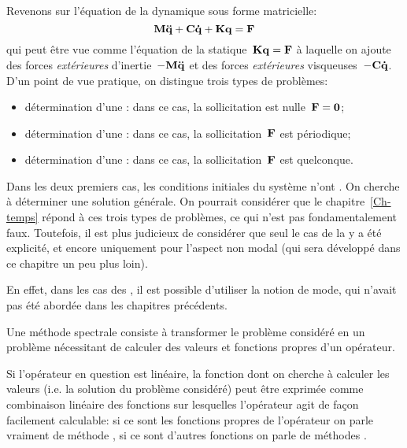 Revenons sur l'équation de la dynamique sous forme matricielle:
\begin{equation} \MM{M}\VV{\ddot{q}}+\MM{C}\VV{\dot{q}}+\MM{K}\VV{q}=\VV{F} \end{equation}
qui peut être vue comme l'équation de la statique~$\MM{K}\VV{q}=\VV{F}$ à laquelle on ajoute des forces \emph{extérieures} d'inertie~$-\MM{M}\VV{\ddot{q}}$ et des forces \emph{extérieures} visqueuses~$-\MM{C}\VV{\dot{q}}$.
\medskipvm
D'un point de vue pratique, on distingue trois types de problèmes:
\begin{itemize}
  \item détermination d'une :
	dans ce cas, la sollicitation est nulle~$\VV{F} = \VV{0}$;
  \item détermination d'une :
 	dans ce cas, la sollicitation~$\VV{F}$ est périodique;
  \item détermination d'une :
	dans ce cas, la sollicitation~$\VV{F}$ est quelconque.
\end{itemize}
Dans les deux premiers cas, les conditions initiales du système n'ont .
On cherche à déterminer une solution générale.
\medskipvm
On pourrait considérer que le chapitre~\ref{Ch-temps} répond à ces trois types de problèmes, ce qui n'est pas fondamentalement faux. Toutefois, il est plus judicieux de considérer que seul le cas de la  y a été explicité, et encore uniquement pour l'aspect non modal (qui sera développé dans ce chapitre un peu plus loin).

En effet, dans les cas des , il est possible d'utiliser la notion de mode, qui n'avait pas été abordée dans les chapitres précédents.

\begin{definition}
Une méthode spectrale consiste à transformer le problème considéré en un problème nécessitant de calculer des valeurs et fonctions propres d'un opérateur.

Si l'opérateur en question est linéaire, la fonction dont on cherche à calculer les valeurs (i.e. la solution du problème considéré) peut être exprimée comme combinaison linéaire des fonctions sur lesquelles l'opérateur agit de façon facilement calculable: si ce sont les fonctions propres de l'opérateur on parle vraiment de méthode , si ce sont d'autres fonctions on parle de méthodes .
\end{definition}


